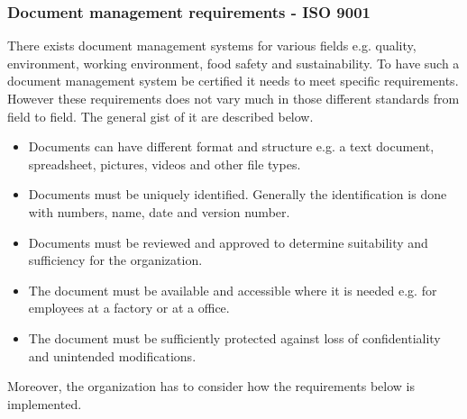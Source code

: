 \subsubsection{Document management requirements - ISO 9001} \label{sec:DMR}
There exists document management systems for various fields e.g. quality, environment, working environment, food safety and sustainability.
To have such a document management system be certified it needs to meet specific requirements.
However these requirements does not vary much in those different standards from field to field.
The general gist of it are described below.

\begin{itemize}
	\item 
	Documents can have different format and structure e.g. a text document, spreadsheet, pictures, videos and other file types. 
	\item 
	Documents must be uniquely identified. 
	Generally the identification is done with numbers, name, date and version number.
	\item 
	Documents must be reviewed and approved to determine suitability and sufficiency for the organization. 
	\item 
	The document must be available and accessible where it is needed e.g. for employees at a factory or at a office.
	\item 
	The document must be sufficiently protected against loss of confidentiality and unintended modifications.
\end{itemize}

Moreover, the organization has to consider how the requirements below is implemented.

